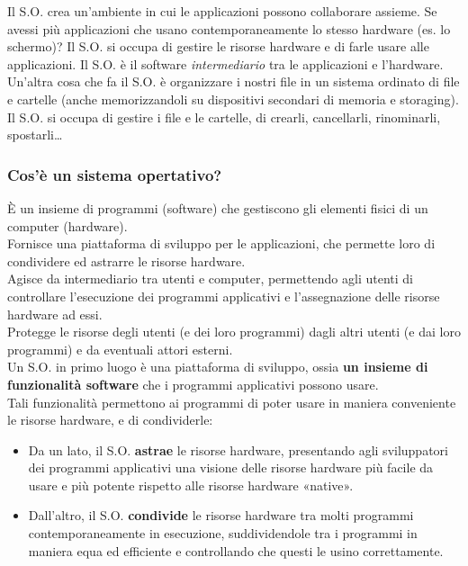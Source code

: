 Il S.O. crea un'ambiente in cui le applicazioni possono collaborare assieme. Se avessi più applicazioni che usano contemporaneamente lo stesso hardware (es. lo schermo)? Il S.O. si occupa di gestire le risorse hardware e di farle usare alle applicazioni. Il S.O. è il software \textit{intermediario} tra le applicazioni e l'hardware.\\
Un'altra cosa che fa il S.O. è organizzare i nostri file in un sistema ordinato di file e cartelle (anche memorizzandoli su dispositivi secondari di memoria e storaging). Il S.O. si occupa di gestire i file e le cartelle, di crearli, cancellarli, rinominarli, spostarli\dots 

\subsubsection{Cos'è un sistema opertativo?}
È un insieme di programmi (software) che gestiscono gli elementi fisici di un computer (hardware).\\
\vspace{5mm}
Fornisce una piattaforma di sviluppo per le applicazioni, che permette loro di condividere ed astrarre le risorse hardware.\\
Agisce da intermediario tra utenti e computer, permettendo agli utenti di controllare l'esecuzione dei programmi applicativi e l'assegnazione delle risorse hardware ad essi.\\
Protegge le risorse degli utenti (e dei loro programmi) dagli altri utenti (e dai loro programmi) e da eventuali attori esterni.\\
\vspace{5mm}
Un S.O. in primo luogo è una piattaforma di sviluppo, ossia \textbf{un insieme di funzionalità software} che i programmi applicativi possono usare.\\
Tali funzionalità permettono ai programmi di poter usare in maniera conveniente le risorse hardware, e di condividerle:
\begin{itemize}
    \item Da un lato, il S.O. \textbf{astrae} le risorse hardware, presentando agli sviluppatori dei programmi applicativi una visione delle risorse hardware più facile da usare e più potente rispetto alle risorse hardware «native».
    \item Dall'altro, il S.O. \textbf{condivide} le risorse hardware tra molti programmi contemporaneamente in esecuzione, suddividendole tra i programmi in maniera equa ed efficiente e controllando che questi le usino correttamente.
\end{itemize}

